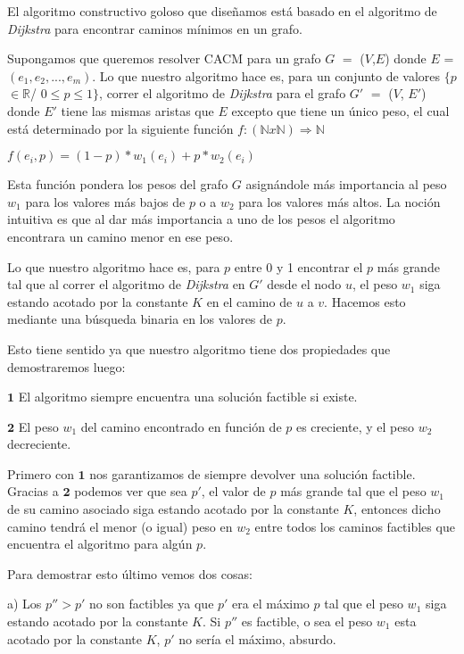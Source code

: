 El algoritmo constructivo goloso que diseñamos está basado en el algoritmo de \emph{Dijkstra} para encontrar caminos mínimos en un grafo. 

Supongamos que queremos resolver CACM para un grafo $G$ $=$ ($V$,$E$) donde $E$ = $(e_1, e_2, ..., e_m)$. Lo que nuestro algoritmo hace es, para un conjunto de valores $\{p$ $\in \mathbb{R}$/ $0 \leq p \leq 1\}$, correr el algoritmo de \emph{Dijkstra} para el grafo $G'$ $=$ ($V$, $E'$) donde $E'$ tiene las mismas aristas que $E$ excepto que tiene un único peso, el cual está determinado por la siguiente función $f: (\mathbb{N} x \mathbb{N}) \Rightarrow \mathbb{N}$

\begin{center}
$f(e_i,p) = (1-p)*w_1(e_i) + p*w_2(e_i)$
\end{center}

Esta función pondera los pesos del grafo $G$ asignándole más importancia al peso $w_1$ para los valores más bajos de $p$ o a $w_2$ para los valores más altos. La noción intuitiva es que al dar m\'as importancia a uno de los pesos el algoritmo encontrara un camino menor en ese peso.

Lo que nuestro algoritmo hace es, para $p$ entre 0 y 1 encontrar el $p$ más grande tal que al correr el algoritmo de \emph{Dijkstra} en $G'$ desde el nodo $u$, el peso $w_1$ siga estando acotado por la constante $K$ en el camino de $u$ a $v$. Hacemos esto mediante una búsqueda binaria en los valores de $p$.

Esto tiene sentido ya que nuestro algoritmo tiene dos propiedades que demostraremos luego:

$\mathbf{1}$ El algoritmo siempre encuentra una solución factible si existe.

$\mathbf{2}$ El peso $w_1$ del camino encontrado en función de $p$ es creciente, y el peso $w_2$ decreciente.

Primero con $\mathbf{1}$ nos garantizamos de siempre devolver una solución factible.
Gracias a $\mathbf{2}$ podemos ver que sea $p'$, el valor de $p$ más grande tal que el peso $w_1$ de su camino asociado siga estando acotado por la constante $K$, entonces dicho camino tendrá el menor (o igual) peso en $w_2$ entre todos los caminos factibles que encuentra el algoritmo para algún $p$.

Para demostrar esto último vemos dos cosas:

a) Los $p'' > p'$ no son factibles ya que $p'$ era el m\'aximo $p$  tal que el peso $w_1$ siga estando acotado por la constante $K$. Si $p''$ es factible, o sea el peso $w_1$ esta acotado por la constante $K$, $p'$ no ser\'ia el m\'aximo, absurdo.

